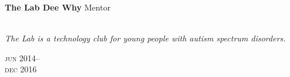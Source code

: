 

\begin{minipage}[t]{\mainboxwidth\textwidth}
\textbf{The Lab Dee Why}\phantom{..} Mentor \\
\\
{\small
\textit{The Lab is a technology club for young people with autism spectrum disorders.}
\par}
\end{minipage}
\begin{minipage}[t]{\detailboxwidth\textwidth}
{
\hfill \textsc{jun} 2014--\\ 
\hspace*{0pt} \hfill \textsc{dec} 2016
\par
}
\end{minipage}
\\


